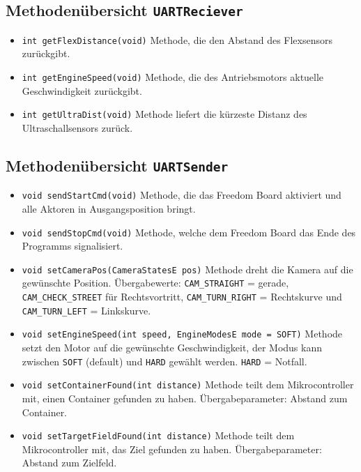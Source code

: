 \documentclass[a4paper, 10pt, fleqn]{article}
\newcommand{\code}[1]{\texttt{#1}}
\begin{document}
\subsection{Methodenübersicht \code{UARTReciever}}
\begin{itemize}
\item \code{int getFlexDistance(void)} Methode, die den Abstand des Flexsensors zurückgibt.
\item \code{int getEngineSpeed(void)} Methode, die des Antriebsmotors aktuelle Geschwindigkeit zurückgibt.
\item \code{int getUltraDist(void)} Methode liefert die kürzeste Distanz des Ultraschallsensors zurück.
\end{itemize}
\subsection{Methodenübersicht \code{UARTSender}}
\begin{itemize}
\item \code{void sendStartCmd(void)} Methode, die das Freedom Board aktiviert und alle Aktoren in Ausgangsposition bringt.
\item \code{void sendStopCmd(void)} Methode, welche dem Freedom Board das Ende des Programms signalisiert.
\item \code{void setCameraPos(CameraStatesE pos)} Methode dreht die Kamera auf die gewünschte Position. Übergabewerte: \code{CAM\_STRAIGHT} = gerade, \code{CAM\_CHECK\_STREET} für Rechtsvortritt, \code{CAM\_TURN\_RIGHT} = Rechtskurve und \code{CAM\_TURN\_LEFT} = Linkskurve.
\item \code{void setEngineSpeed(int speed, EngineModesE mode = SOFT)} Methode setzt den Motor auf die gewünschte Geschwindigkeit, der Modus kann zwischen \code{SOFT} (default) und \code{HARD} gewählt werden. \code{HARD} = Notfall.
\item \code{void setContainerFound(int distance)} Methode teilt dem Mikrocontroller mit, einen Container gefunden zu haben. Übergabeparameter: Abstand zum Container.
\item \code{void setTargetFieldFound(int distance)}  Methode teilt dem Mikrocontroller mit, das Ziel gefunden zu haben. Übergabeparameter: Abstand zum Zielfeld.
\end{itemize}
\end{document}
